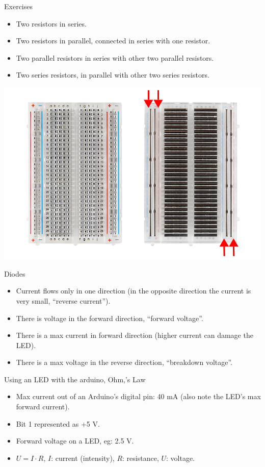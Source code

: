 \documentclass[aspectratio=1610]{beamer}
\begin{document}
\begin{frame}[plain,t]{Exercises}

\begin{itemize}
\item Two resistors in series.
\item Two resistors in parallel, connected in series with one
  resistor.
\item Two parallel resistors in series with other two parallel
  resistors.
\item Two series resistors, in parallel with other two series resistors.
\end{itemize}

\bigskip
\begin{center}
\includegraphics[width=.7\textwidth]{figs/1-breadboard.jpg}
\end{center}
\end{frame}



\begin{frame}[plain,t]{Diodes}
\begin{itemize}
\item Current flows only in one direction (in the opposite direction
  the current is very small, ``reverse current'').
\item There is voltage in the forward direction, ``forward voltage''.
\item There is a max current in forward direction (higher current can
  damage the LED).
\item There is a max voltage in the reverse direction, ``breakdown voltage''.
\end{itemize}
\end{frame}



\begin{frame}[plain,t]{Using an LED with the arduino, Ohm,'s Law}
\begin{itemize}
\item Max current out of an Arduino's digital pin: 40 mA (also note
  the LED's max forward current).
\item Bit 1 represented as +5 V. 
\item Forward voltage on a LED, eg: 2.5 V.
\item $U = I \cdot R$, $I$: current (intensity), $R$: resistance, $U$:
  voltage.
\end{itemize}
\end{frame}
\end{document}
